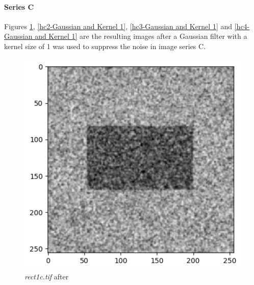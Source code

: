 \documentclass[runningheads]{llncs}
\begin{document}
\paragraph*{\textbf{Series C}}
Figures \ref{hc1-Gaussian and Kernel 1}, \ref{hc2-Gaussian and Kernel 1}, \ref{hc3-Gaussian and Kernel 1} and \ref{hc4-Gaussian and Kernel 1} are the resulting images after a Gaussian filter with a kernel size of 1 was used to suppress the noise in image series C. 
\begin{figure}[h!]
\begin{minipage}[h]{0.47\linewidth}
\begin{center}
\includegraphics[width=1\linewidth]{Report/Result_Images/image_hc1.png} 
\caption{\emph{rect1c.tif} after}
\label{hc1-Gaussian and Kernel 1}
\end{center} 
\end{minipage}
\hfill
\vspace{0.2 cm}
\begin{minipage}[h]{0.47\linewidth}
\begin{center}

\end{center}
\end{minipage}
\end{figure}
\end{document}
